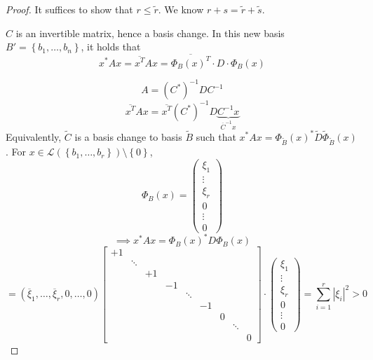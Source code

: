 \documentclass{article}
\newcommand{\set}[1]{\left\{#1\right\}}
\newcommand{\card}[1]{\left|#1\right|}
\begin{document}
\begin{proof}
  It suffices to show that $r \leq \tilde r$.
  We know $r+s = \tilde r + \tilde s$.

  $C$ is an invertible matrix, hence a basis change.
  In this new basis $B' = \set{b_1, \dots, b_n}$, it holds that
  \[ x^* A x = \overline{x^T} A x = \overline{\Phi_B(x)^T} \cdot D \cdot \Phi_B(x) \]

  \[ A = (C^*)^{-1} D C^{-1} \]
  \[ \overline{x^T} A x = \overline{x^T} (C^*)^{-1} D \underbrace{C^{-1} x}_{\overline{C}^{-1} x} \]
  Equivalently, $\tilde C$ is a basis change to basis $\tilde B$
  such that $x^* Ax = \Phi_{\tilde B}(x)^* \tilde D \tilde\Phi_{\tilde B}(x)$.
  For $x \in \mathcal L(\set{b_1, \dots, b_r}) \setminus \set{0}$,
  \[ \Phi_B(x) = \begin{pmatrix} \xi_1 \\ \vdots \\ \xi_r \\ 0 \\ \vdots \\ 0 \end{pmatrix} \]
  \[ \implies x^* A x = \Phi_B(x)^* D \Phi_B(x) \]
  \[
    = (\overline{\xi}_1, \dots, \overline{\xi}_r, 0, \dots, 0)
    \begin{bmatrix}
       +1 &        &       &    &        &    &   &        & \\
          & \ddots &       &    &        &    &   &        & \\
          &        &    +1 &    &        &    &   &        & \\
          &        &       & -1 &        &    &   &        & \\
          &        &       &    & \ddots &    &   &        & \\
          &        &       &    &        & -1 &   &        & \\
          &        &       &    &        &    & 0 &        & \\
          &        &       &    &        &    &   & \ddots & \\
          &        &       &    &        &    &   &        & 0
    \end{bmatrix} \cdot
    \begin{pmatrix}
      \xi_1 \\ \vdots \\ \xi_r \\ 0 \\ \vdots \\ 0
    \end{pmatrix}
    = \sum_{i=1}^r \card{\xi_i}^2 > 0
\]
\end{proof}
\end{document}
